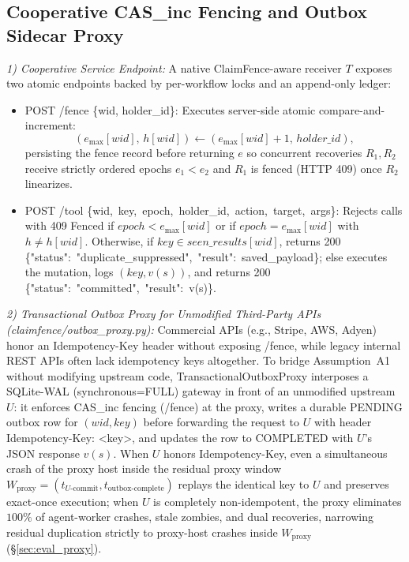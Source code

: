 \documentclass[10pt,journal]{IEEEtran}
\def\CF{ClaimFence}%
\def\texttt#1{#1}%
\theoremstyle{definition}
\theoremstyle{remark}
\newcommand{\CF}{\textsc{ClaimFence}}
\begin{document}
\subsection{Cooperative \texorpdfstring{\texttt{CAS\_inc}}{CAS\_inc} Fencing and Outbox Sidecar Proxy}
\emph{1) Cooperative Service Endpoint:} A native \CF{}-aware receiver $T$ exposes two atomic endpoints backed by per-workflow locks and an append-only ledger:
\begin{itemize}
  \item \texttt{POST /fence \{wid, holder\_id\}}: Executes server-side atomic compare-and-increment:
  \begin{equation}\label{eq:cas_fence}
    (e_{\max}[\mathit{wid}],\, h[\mathit{wid}]) \leftarrow (e_{\max}[\mathit{wid}] + 1,\, \mathit{holder\_id}),
  \end{equation}
  persisting the fence record before returning $e$ so concurrent recoveries $R_1, R_2$ receive strictly ordered epochs $e_1 < e_2$ and $R_1$ is fenced (\texttt{HTTP 409}) once $R_2$ linearizes.
  \item \texttt{POST /tool \{\allowbreak wid,\allowbreak\ key,\allowbreak\ epoch,\allowbreak\ holder\_id,\allowbreak\ action,\allowbreak\ target,\allowbreak\ args\}}: Rejects calls with \texttt{409 Fenced} if $\mathit{epoch} < e_{\max}[\mathit{wid}]$ or if $\mathit{epoch} = e_{\max}[\mathit{wid}]$ with $h \neq h[\mathit{wid}]$. Otherwise, if $\mathit{key} \in \mathit{seen\_results}[\mathit{wid}]$, returns \texttt{200 \{"status":\allowbreak\ "duplicate\_suppressed",\allowbreak\ "result":\allowbreak\ saved\_payload\}}; else executes the mutation, logs $(\mathit{key}, v(s))$, and returns \texttt{200 \{"status":\allowbreak\ "committed",\allowbreak\ "result":\allowbreak\ v(s)\}}.
\end{itemize}

\emph{2) Transactional Outbox Proxy for Unmodified Third-Party APIs (\texttt{claimfence/\allowbreak outbox\_proxy.py}):} Commercial APIs (e.g., Stripe, AWS, Adyen) honor an \texttt{Idempotency-Key} header without exposing \texttt{/fence}, while legacy internal REST APIs often lack idempotency keys altogether. To bridge Assumption~A1 without modifying upstream code, \texttt{TransactionalOutboxProxy} interposes a \texttt{SQLite-WAL} (\texttt{synchronous=FULL}) gateway in front of an unmodified upstream $U$: it enforces \texttt{CAS\_inc} fencing (\texttt{/fence}) at the proxy, writes a durable \texttt{PENDING} outbox row for $(\mathit{wid}, \mathit{key})$ before forwarding the request to $U$ with header \texttt{Idempotency-Key: <key>}, and updates the row to \texttt{COMPLETED} with $U$'s JSON response $v(s)$. When $U$ honors \texttt{Idempotency-Key}, even a simultaneous crash of the proxy host inside the residual proxy window $W_{\mathrm{proxy}} = (t_{U\text{-commit}}, t_{\mathrm{outbox\text{-}complete}})$ replays the identical key to $U$ and preserves exact-once execution; when $U$ is completely non-idempotent, the proxy eliminates $100\%$ of agent-worker crashes, stale zombies, and dual recoveries, narrowing residual duplication strictly to proxy-host crashes inside $W_{\mathrm{proxy}}$ (\S\ref{sec:eval_proxy}).
\end{document}
